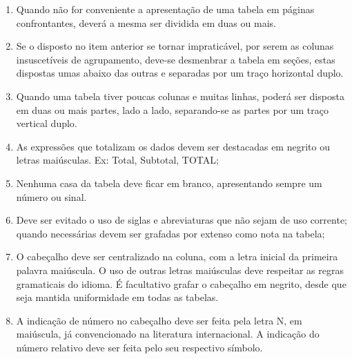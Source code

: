\begin{enumerate}
\item Quando não for
conveniente a apresentação de uma tabela em páginas confrontantes,
deverá a mesma ser dividida em duas ou mais. 
\item Se o disposto
no item anterior se tornar impraticável, por serem as colunas
insuscetíveis de agrupamento, deve-se desmenbrar a tabela em
seções, estas dispostas umas abaixo das outras e separadas por um traço horizontal duplo. 
\item Quando uma tabela tiver poucas
colunas e muitas linhas, poderá ser disposta em duas ou mais
partes, lado a lado, separando-se as partes por um traço vertical
duplo.
\item As expressões que totalizam os dados devem ser destacadas em negrito ou letras maiúsculas. Ex: Total, Subtotal, TOTAL;
\item Nenhuma casa da tabela deve ficar em branco, apresentando sempre um número ou sinal.
\item Deve ser evitado o uso de siglas e abreviaturas que não sejam de uso corrente; quando necessárias devem ser grafadas por extenso como nota na tabela;
\item O cabeçalho deve ser centralizado na coluna, com a letra inicial da primeira palavra maiúscula. O uso de outras letras maiúsculas deve respeitar as regras gramaticais do idioma. É facultativo grafar o cabeçalho em negrito, desde que seja mantida uniformidade em todas as tabelas.
\item A indicação de número no cabeçalho deve ser feita pela letra N, em maiúscula, já convencionado na literatura internacional. A indicação do número relativo deve ser feita pelo seu respectivo símbolo.
\end{enumerate}





